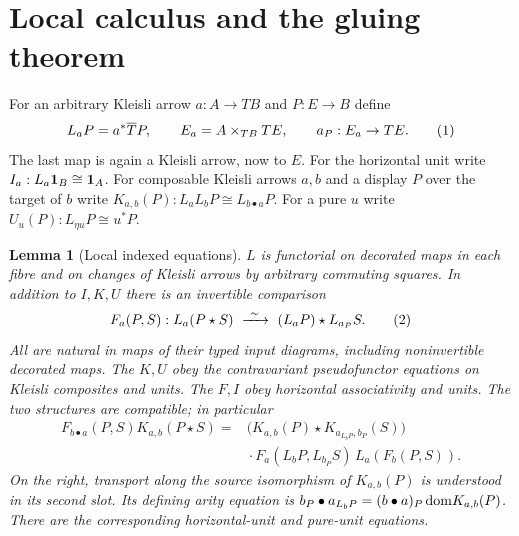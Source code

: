 \documentclass[11pt]{article}
\newtheorem{lemma}[theorem]{Lemma}
\theoremstyle{definition}\newtheorem{definition}[theorem]{Definition}
\newcommand{\st}{\mathbin{\star}}\newcommand{\bx}{\mathop{\boxtimes}}
\begin{document}
\section{Local calculus and the gluing theorem}\label{sec:glue}
For an arbitrary Kleisli arrow $a:A\to TB$ and $P:E\to B$ define
\[
 L_a P=a^*\overline T P,\qquad
 E_a=A\times_{TB}TE,\qquad a_P:E_a\to TE.
 \label{eq:La}\tag{1}
\]
The last map is again a Kleisli arrow, now to $E$.
For the horizontal unit write $I_a:L_a\mathbf1_B\cong\mathbf1_A$.
For composable Kleisli arrows $a,b$ and a display $P$ over the target
of $b$ write $K_{a,b}(P):L_a L_b P\cong L_{b\bullet a}P$.
For a pure $u$ write $U_u(P):L_{\eta u}P\cong u^*P$.

\begin{lemma}[Local indexed equations]\label{lem:local}
$L$ is functorial on decorated maps in each fibre and on changes of
Kleisli arrows by arbitrary commuting squares. In addition to $I,K,U$
there is an invertible comparison
\[
 F_a(P,S):L_a(P\st S)\ \iso\ (L_aP)\st L_{a_P}S.
 \tag{2}\label{eq:F}
\]
All are natural in maps of their typed input diagrams, including
noninvertible decorated maps. The $K,U$ obey the contravariant
pseudofunctor equations on Kleisli composites and units.
The $F,I$ obey horizontal associativity and units. The two structures
are compatible; in particular
\begin{align}
 F_{b\bullet a}(P,S)K_{a,b}(P\st S)
  ={}&
  \bigl(K_{a,b}(P)\st K_{a_{L_bP},b_P}(S)\bigr)
  \nonumber\\[-2pt]&{}\cdot
  F_a(L_bP,L_{b_P}S)\, L_a(F_b(P,S)).
 \tag{3}\label{eq:middle}
\end{align}
On the right, transport along the source isomorphism of $K_{a,b}(P)$
is understood in its second slot. Its defining arity equation is
$b_P\bullet a_{L_bP}=(b\bullet a)_P\,\mathrm{dom} K_{a,b}(P)$.
There are the corresponding horizontal-unit and pure-unit equations.
\end{lemma}
\end{document}
